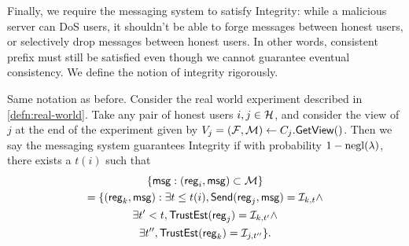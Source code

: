 Finally, we require the messaging system to satisfy Integrity: while a malicious server can DoS users, it shouldn't be able to forge messages between honest users, or selectively drop messages between honest users. In other words, consistent prefix must still be satisfied even though we cannot guarantee eventual consistency. We define the notion of integrity rigorously.
\begin{definition}[Integrity]
\label{defn:integrity}
Same notation as before. Consider the real world experiment described in \cref{defn:real-world}. Take any pair of honest users $i, j \in \mathcal{H}$, and consider the view of $j$ at the end of the experiment given by $V_j = (\mathcal{F}, \mathcal{M}) \leftarrow C_j.\mathsf{GetView}()$.  Then we say the messaging system guarantees Integrity if with probability $1 - \operatorname{negl}(\lambda)$, there exists a $t(i)$ such that
\begin{multline*}
     \{\mathsf{msg} : (\mathsf{reg}_i, \mathsf{msg}) \subset \mathcal{M}\} \\
      = \{(\mathsf{reg}_k, \mathsf{msg}): \exists t \leq t(i), \mathsf{Send}(\mathsf{reg}_j, \mathsf{msg}) = \mathcal{I}_{k, t} \land \\
             \exists t' < t, \mathsf{TrustEst}(\mathsf{reg}_j) = \mathcal{I}_{k, t'} \land \\
             \exists t'', \mathsf{TrustEst}(\mathsf{reg}_k) = \mathcal{I}_{j, t''}\}. \\   
\end{multline*}
\end{definition}